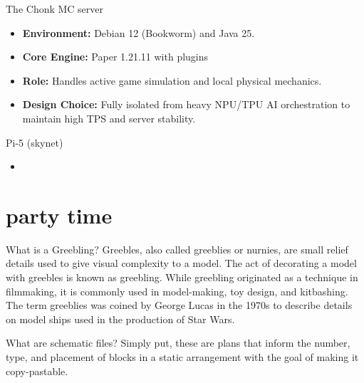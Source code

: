 \documentclass[notes]{beamer}
\begin{document}
	\begin{frame}{The Chonk MC server}
		\begin{itemize}
			\item \textbf{Environment:} Debian 12 (Bookworm) and Java 25.
			\item \textbf{Core Engine:} Paper 1.21.11 with plugins
			\item \textbf{Role:} Handles active game simulation and local physical mechanics.
			\item \textbf{Design Choice:} Fully isolated from heavy NPU/TPU AI orchestration to maintain high TPS and server stability.
		\end{itemize}
	\end{frame}
	
	\begin{frame}{Pi-5 (skynet)}
		\begin{itemize}
			\item 
		\end{itemize}
	\end{frame}

	\section{party time}

	\begin{frame}{What is a Greebling?}
		Greebles, also called greeblies or nurnies, are small relief details used to give visual complexity to a model. The act of decorating a model with greebles is known as greebling. While greebling originated as a technique in filmmaking, it is commonly used in model-making, toy design, and kitbashing. The term greeblies was coined by George Lucas in the 1970s to describe details on model ships used in the production of Star Wars.
	\end{frame}

	\begin{frame}{What are schematic files?}
		Simply put, these are plans that inform the number, type, and placement of blocks in a static arrangement with the goal of making it copy-pastable.
	\end{frame}
	
\end{document}
